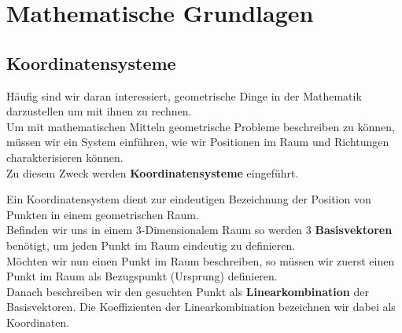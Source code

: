 
\section{Mathematische Grundlagen}
\label{chap:Style}

\subsection{Koordinatensysteme}

Häufig sind wir daran interessiert, geometrische Dinge in der Mathematik darzustellen um mit ihnen zu rechnen. \\
Um mit mathematischen Mitteln geometrische Probleme beschreiben zu können, müssen wir ein System einführen, wie wir
Positionen im Raum und Richtungen charakterisieren können. \\
Zu diesem Zweck werden \textbf{Koordinatensysteme} eingeführt.

\beginip
Ein Koordinatensystem dient zur eindeutigen Bezeichnung der Position von Punkten in einem geometrischen Raum.  \\
Befinden wir uns in einem 3-Dimensionalem Raum so werden 3 \textbf{Basisvektoren} benötigt, um jeden Punkt im Raum eindeutig zu definieren. \\
Möchten wir nun einen Punkt im Raum beschreiben, so müssen wir zuerst einen Punkt im Raum als Bezugspunkt (Ursprung) definieren. \\
Danach beschreiben wir den gesuchten Punkt als \textbf{Linearkombination} der Basisvektoren. Die Koeffizienten der Linearkombination bezeichnen wir dabei als Koordinaten.
\iend


